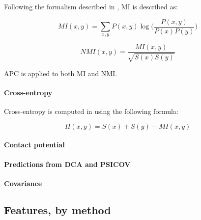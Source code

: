             Following the formalism described in \cite{Michel383133}, MI is described as:

            \begin{equation}
                MI(x, y) = \sum\limits_{x, y} P(x, y) \log \Big( \frac{P(x, y)}{P(x) P(y)} \Big)
            \end{equation}

            \begin{equation}
                NMI(x, y) = \frac{MI(x, y)}{\sqrt{S(x) S(y)}}
            \end{equation}

            APC is applied to both MI and NMI.

        \paragraph{Cross-entropy}

            Cross-entropy is computed in \cite{Michel383133} using the following formula:
            
            \begin{equation}
                H(x, y) = S(x) + S(y) - MI(x, y)
            \end{equation}

        \paragraph{Contact potential}

        \paragraph{Predictions from DCA and PSICOV}

        \paragraph{Covariance}

    \subsection{Features, by method}

